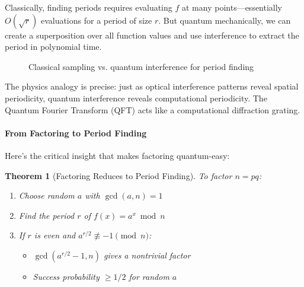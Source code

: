 \documentclass[11pt,a4paper]{article}
\newtheorem{theorem}{Theorem}
\begin{document}
Classically, finding periods requires evaluating $f$ at many points---essentially $O(\sqrt{r})$ evaluations for a period of size $r$. But quantum mechanically, we can create a superposition over all function values and use interference to extract the period in polynomial time.

\begin{figure}[h]
\centering
{}
\caption{Classical sampling vs. quantum interference for period finding}
\end{figure}

The physics analogy is precise: just as optical interference patterns reveal spatial periodicity, quantum interference reveals computational periodicity. The Quantum Fourier Transform (QFT) acts like a computational diffraction grating.

\paragraph{From Factoring to Period Finding}

Here's the critical insight that makes factoring quantum-easy:

\begin{theorem}[Factoring Reduces to Period Finding]
To factor $n = pq$:
\begin{enumerate}
    \item Choose random $a$ with $\gcd(a,n) = 1$
    \item Find the period $r$ of $f(x) = a^x \bmod n$
    \item If $r$ is even and $a^{r/2} \not\equiv -1 \pmod{n}$:
    \begin{itemize}
        \item $\gcd(a^{r/2} - 1, n)$ gives a nontrivial factor
        \item Success probability $\geq 1/2$ for random $a$
    \end{itemize}
\end{enumerate}
\end{theorem}
\end{document}
